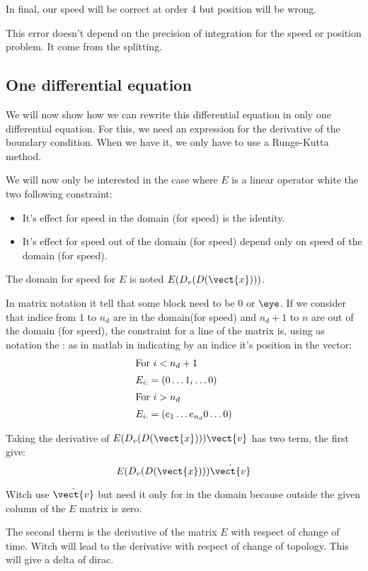 In final, our speed will be correct at order $4$ but position will be wrong.

This error doesn't depend on the precision of integration for the speed or position problem.
It come from the splitting.

\subsection{One differential equation}

We will now show how we can rewrite this differential equation in only one differential equation.
For this, we need an expression for the derivative of the boundary condition.
When we have it, we only have to use a Runge-Kutta method.


We will now only be interested in the case where $E$ is a linear operator white the two following constraint:
\begin{itemize}
	\item It's effect for speed in the domain (for speed) is the identity.
	\item It's effect for speed out of the domain (for speed) depend only on speed of the domain (for speed).
\end{itemize}

The domain for speed for $E$ is noted $E(D_v(D(\vect{x})))$.

In matrix notation it tell that some block need to be $0$ or $\eye$.
If we consider that indice from $1$ to $n_d$ are in the domain(for speed) and $n_d+1$ to $n$ are out of the domain (for speed), the constraint for a line of the matrix is,
using as notation the : as in matlab in indicating by an indice it's position in the vector:
\begin{align}
	\intertext{For $i<n_d+1$}
	E_{i :}&=\left( 0 \ldots 1_{i} \ldots 0\right)\\
	\intertext{For $i>n_d$}
	E_{i :}&=\left( e_{1}\ldots e_{n_d} 0\ldots 0\right)\\
\end{align}

Taking the derivative of $E(D_v(D(\vect{x})))\vect{v}$ has two term, the first give:
\begin{equation}
	E(D_v(D(\vect{x})))\dot{\vect{v}}
\end{equation}

Witch use $\dot{\vect{v}}$ but need it only for in the domain because outside the given column of the $E$ matrix is zero.

The second therm is the derivative of the matrix $E$ with respect of change of time. Witch will lead to the derivative with respect of change of topology.
This will give a delta of dirac.

